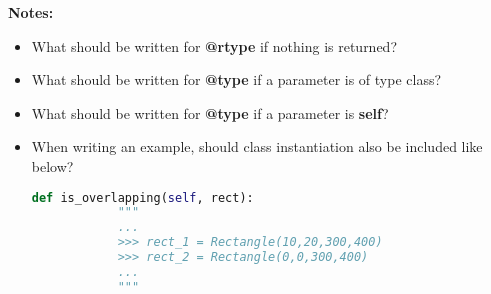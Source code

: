 \documentclass[12pt]{article}
\begin{document}
\begin{enumerate}
    \bigskip

    \textbf{Notes:}

    \begin{itemize}
    \item What should be written for \textbf{@rtype} if nothing is returned?
    \item What should be written for \textbf{@type} if a parameter is of type class?
    \item What should be written for \textbf{@type} if a parameter is \textbf{self}?
    \item When writing an example, should class instantiation also be included like below?

    \begin{lstlisting}[language=Python]
        def is_overlapping(self, rect):
            """
            ...
            >>> rect_1 = Rectangle(10,20,300,400)
            >>> rect_2 = Rectangle(0,0,300,400)
            ...
            """
    \end{lstlisting}
    \end{itemize}
\end{enumerate}
\end{document}

